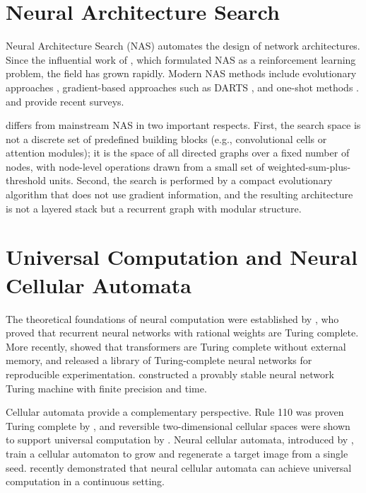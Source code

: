 \section{Neural Architecture Search}
\label{sec:nas}

Neural Architecture Search (NAS) automates the design of network
architectures. Since the influential work of \citet{zoph2017neural},
which formulated NAS as a reinforcement learning problem, the field has grown
rapidly. Modern NAS methods include evolutionary approaches
\citep{real2019regularized}, gradient-based approaches such as DARTS
\citep{liu2019darts}, and one-shot methods \citep{pham2018efficient}.
\citet{ren2024advances} and \citet{ozcelik2026evolutionary} provide recent
surveys.

\modnet{} differs from mainstream NAS in two important respects. First, the
search space is not a discrete set of predefined building blocks (e.g.,
convolutional cells or attention modules); it is the space of all directed
graphs over a fixed number of nodes, with node-level operations drawn from a
small set of weighted-sum-plus-threshold units. Second, the search is
performed by a compact evolutionary algorithm that does not use gradient
information, and the resulting architecture is not a layered stack but a
recurrent graph with modular structure.

\section{Universal Computation and Neural Cellular Automata}
\label{sec:universal}

The theoretical foundations of neural computation were established by
\citet{siegelmann1995computational}, who proved that recurrent neural networks
with rational weights are Turing complete. More recently, \citet{perez2021turing}
showed that transformers are Turing complete without external memory, and
\citet{bates2026pytorch} released a library of Turing-complete neural networks
for reproducible experimentation. \citet{stogin2024provably} constructed a
provably stable neural network Turing machine with finite precision and time.

Cellular automata provide a complementary perspective. Rule 110 was proven
Turing complete by \citet{cook2004universality}, and reversible
two-dimensional cellular spaces were shown to support universal computation
by \citet{morita2002universal}. Neural cellular automata, introduced by
\citet{mordvintsev2020growing}, train a cellular automaton to grow and
regenerate a target image from a single seed. \citet{bena2025path} recently
demonstrated that neural cellular automata can achieve universal computation
in a continuous setting.


